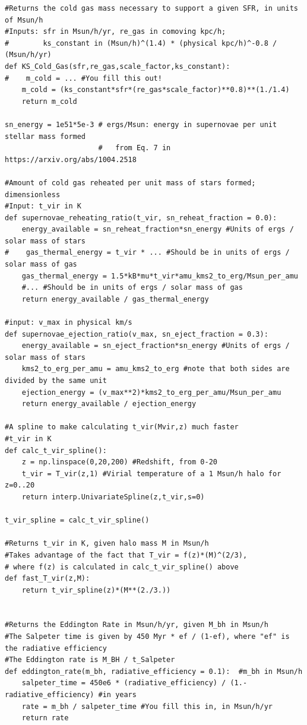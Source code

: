 \documentclass[onecolumn]{aastex62}
\begin{document}
\begin{verbatim}
#Returns the cold gas mass necessary to support a given SFR, in units of Msun/h
#Inputs: sfr in Msun/h/yr, re_gas in comoving kpc/h;
#        ks_constant in (Msun/h)^(1.4) * (physical kpc/h)^-0.8 / (Msun/h/yr)
def KS_Cold_Gas(sfr,re_gas,scale_factor,ks_constant):
#    m_cold = ... #You fill this out!
    m_cold = (ks_constant*sfr*(re_gas*scale_factor)**0.8)**(1./1.4)
    return m_cold

sn_energy = 1e51*5e-3 # ergs/Msun: energy in supernovae per unit stellar mass formed
                      #   from Eq. 7 in https://arxiv.org/abs/1004.2518
    
#Amount of cold gas reheated per unit mass of stars formed; dimensionless
#Input: t_vir in K
def supernovae_reheating_ratio(t_vir, sn_reheat_fraction = 0.0):
    energy_available = sn_reheat_fraction*sn_energy #Units of ergs / solar mass of stars
#    gas_thermal_energy = t_vir * ... #Should be in units of ergs / solar mass of gas
    gas_thermal_energy = 1.5*kB*mu*t_vir*amu_kms2_to_erg/Msun_per_amu
    #... #Should be in units of ergs / solar mass of gas
    return energy_available / gas_thermal_energy

#input: v_max in physical km/s
def supernovae_ejection_ratio(v_max, sn_eject_fraction = 0.3):
    energy_available = sn_eject_fraction*sn_energy #Units of ergs / solar mass of stars
    kms2_to_erg_per_amu = amu_kms2_to_erg #note that both sides are divided by the same unit
    ejection_energy = (v_max**2)*kms2_to_erg_per_amu/Msun_per_amu
    return energy_available / ejection_energy

#A spline to make calculating t_vir(Mvir,z) much faster
#t_vir in K
def calc_t_vir_spline():
    z = np.linspace(0,20,200) #Redshift, from 0-20
    t_vir = T_vir(z,1) #Virial temperature of a 1 Msun/h halo for z=0..20
    return interp.UnivariateSpline(z,t_vir,s=0)

t_vir_spline = calc_t_vir_spline()

#Returns t_vir in K, given halo mass M in Msun/h
#Takes advantage of the fact that T_vir = f(z)*(M)^(2/3),
# where f(z) is calculated in calc_t_vir_spline() above
def fast_T_vir(z,M):
    return t_vir_spline(z)*(M**(2./3.))


#Returns the Eddington Rate in Msun/h/yr, given M_bh in Msun/h
#The Salpeter time is given by 450 Myr * ef / (1-ef), where "ef" is the radiative efficiency
#The Eddington rate is M_BH / t_Salpeter
def eddington_rate(m_bh, radiative_efficiency = 0.1):  #m_bh in Msun/h
    salpeter_time = 450e6 * (radiative_efficiency) / (1.-radiative_efficiency) #in years
    rate = m_bh / salpeter_time #You fill this in, in Msun/h/yr
    return rate


\end{verbatim}
\end{document}
